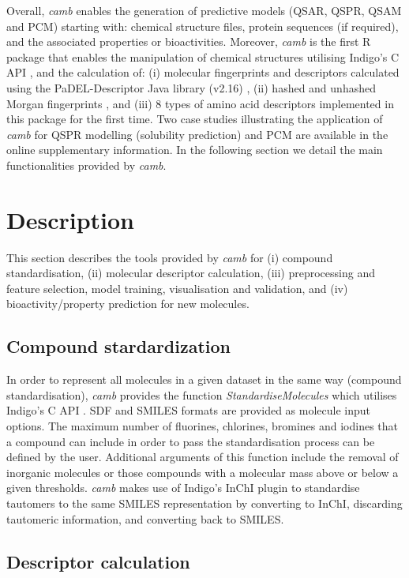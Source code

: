 \documentclass{bioinfo}
\begin{document}
Overall, {\it camb} enables the generation of predictive  models (QSAR, QSPR, QSAM and PCM)
starting with: chemical structure files, protein sequences (if required), and the associated properties or bioactivities.
Moreover, {\it camb} is the first R package that enables the manipulation of chemical structures utilising Indigo's C API \citep{Indigo},
and the calculation of:
(i) molecular fingerprints and descriptors calculated using the PaDEL-Descriptor Java library (v2.16) \citep{padel},
(ii) hashed and unhashed Morgan fingerprints \citep{extended_fp},
and (iii) 8 types of amino acid descriptors implemented in this package for the first time. 
Two case studies illustrating the application of {\it camb} for
QSPR modelling (solubility prediction) and PCM are available in the online supplementary information.
In the following section we detail the main functionalities provided by {\it camb}. 

\section{Description}
This section describes the tools provided by {\it camb} 
for (i) compound standardisation, (ii) molecular descriptor calculation, 
(iii) preprocessing and feature selection, model training, visualisation and validation, and (iv) bioactivity/property prediction for new molecules.	

\subsection{Compound stardardization}

In order to represent all molecules in a given dataset in the same 
way (compound standardisation),
{\it camb}  provides the function {\it StandardiseMolecules} which utilises Indigo's C API \citep{Indigo}.
SDF and SMILES formats are provided as molecule input options.
The maximum number of fluorines, chlorines, bromines and iodines
that a compound can include in order to pass the standardisation process can be defined by the user.
Additional arguments of this function include the removal of inorganic molecules
or those compounds with a molecular mass above or below a given thresholds.
{\it camb} makes use of Indigo's InChI \citep{inchi} plugin to standardise tautomers to the same SMILES representation
by converting to InChI, discarding tautomeric information, and converting back to SMILES.

\subsection{Descriptor calculation} 
\end{document}
